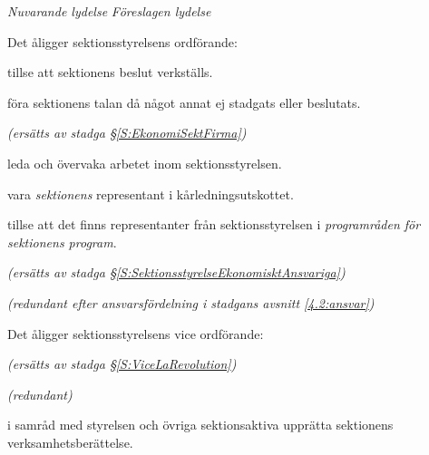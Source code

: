 \documentclass{article}
\newenvironment{lydelse}
    {\begin{paracol}{2}%
        \emph{Nuvarande lydelse}%
        \switchcolumn%
        \emph{Föreslagen lydelse}%
    \end{paracol}%
    \begin{enumerate}[label=\thesubsection.\arabic*]%
    \begin{paracol}{2}%
    }{\end{paracol}\end{enumerate}}
\begin{document}
\begin{lydelse}
    \vspace{0.9em}
    \item Det åligger sektionsstyrelsens ordförande:
    \begin{aligganden}
        \item tillse att sektionens beslut verkställs.
        \item föra sektionens talan då något annat ej stadgats eller beslutats.
        \item[] \emph{(ersätts av stadga \S \ref{S:EkonomiSektFirma})}\vspace{0.3em}
        \item leda och övervaka arbetet inom sektionsstyrelsen.\vspace{0.2em}
        \item vara \emph{sektionens} representant i kårledningsutskottet.
        \item tillse att det finns representanter från sektionsstyrelsen i \emph{programråden för sektionens program}.
        \item[] \emph{(ersätts av stadga \S \ref{S:SektionsstyrelseEkonomisktAnsvariga})}\vspace{1.2em}
        \item[] \emph{(redundant efter ansvarsfördelning i stadgans avsnitt \ref{4.2:ansvar})}
    \end{aligganden}

    \vspace{0.5em}
    \item Det åligger sektionsstyrelsens vice ordförande:
    \begin{aligganden}
        \vspace{-0.2em}
        \item[] \emph{(ersätts av stadga \S \ref{S:ViceLaRevolution})}\vspace{1.2em}
        \item[] \emph{(redundant)}\vspace{0.2em}
        \item i samråd med styrelsen och övriga sektionsaktiva upprätta sektionens verksamhetsberättelse.
    \end{aligganden}



\end{lydelse}
\end{document}
